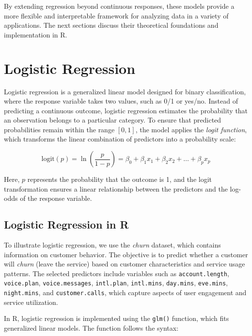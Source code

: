 \documentclass[
]{book}
\newcommand{\passthrough}[1]{#1}
\theoremstyle{definition}
\theoremstyle{definition}
\theoremstyle{definition}
\theoremstyle{definition}
\theoremstyle{remark}
\begin{document}
By extending regression beyond continuous responses, these models provide a more flexible and interpretable framework for analyzing data in a variety of applications. The next sections discuss their theoretical foundations and implementation in R.

\section{Logistic Regression}\label{logistic-regression}

Logistic regression is a generalized linear model designed for binary classification, where the response variable takes two values, such as 0/1 or yes/no. Instead of predicting a continuous outcome, logistic regression estimates the probability that an observation belongs to a particular category. To ensure that predicted probabilities remain within the range \([0,1]\), the model applies the \emph{logit function}, which transforms the linear combination of predictors into a probability scale:

\[
\text{logit}(p) = \ln\left(\frac{p}{1-p}\right) = \beta_0 + \beta_1 x_1 + \beta_2 x_2 + \dots + \beta_p x_p
\]

Here, \(p\) represents the probability that the outcome is 1, and the logit transformation ensures a linear relationship between the predictors and the log-odds of the response variable.

\subsection*{Logistic Regression in R}\label{logistic-regression-in-r}

To illustrate logistic regression, we use the \emph{churn} dataset, which contains information on customer behavior. The objective is to predict whether a customer will \emph{churn} (leave the service) based on customer characteristics and service usage patterns. The selected predictors include variables such as \passthrough{\lstinline!account.length!}, \passthrough{\lstinline!voice.plan!}, \passthrough{\lstinline!voice.messages!}, \passthrough{\lstinline!intl.plan!}, \passthrough{\lstinline!intl.mins!}, \passthrough{\lstinline!day.mins!}, \passthrough{\lstinline!eve.mins!}, \passthrough{\lstinline!night.mins!}, and \passthrough{\lstinline!customer.calls!}, which capture aspects of user engagement and service utilization.

In R, logistic regression is implemented using the \passthrough{\lstinline!glm()!} function, which fits generalized linear models. The function follows the syntax:
\end{document}
